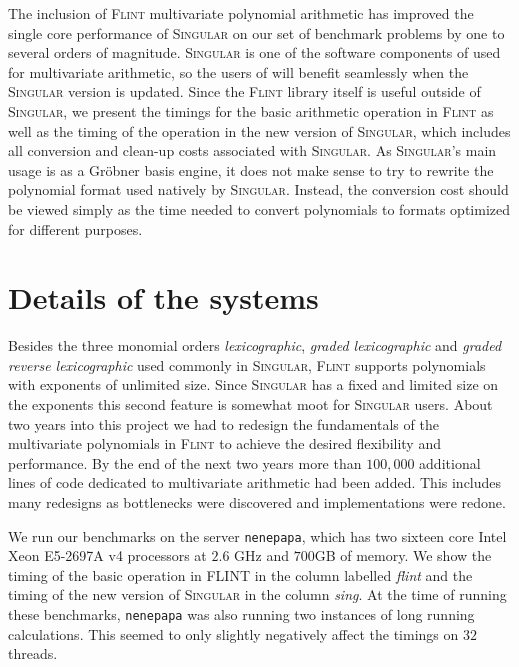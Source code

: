 \documentclass{deliverablereport}
\begin{document}
The inclusion of \textsc{Flint} multivariate polynomial arithmetic has improved the single core performance of \textsc{Singular} on our set of benchmark problems by one to several orders of magnitude. \textsc{Singular} is one of the software components of \Sage used for multivariate arithmetic, so the users of \Sage will benefit seamlessly when the \textsc{Singular} version is updated. Since the \textsc{Flint} library itself is useful outside of \textsc{Singular}, we present the timings for the basic arithmetic operation in \textsc{Flint} as well as the timing of the operation in the new version of \textsc{Singular}, which includes all conversion and clean-up costs associated with \textsc{Singular}. As \textsc{Singular}'s main usage is as a Gr\"obner basis engine, it does not make sense to try to rewrite the polynomial format used natively by \textsc{Singular}. Instead, the conversion cost should be viewed simply as the time needed to convert polynomials to formats optimized for different purposes.

\section{Details of the systems}
Besides the three monomial orders \emph{lexicographic}, \emph{graded lexicographic} and \emph{graded reverse lexicographic} used commonly in \textsc{Singular}, \textsc{Flint} supports polynomials with exponents of unlimited size. Since \textsc{Singular} has a fixed and limited size on the exponents this second feature is somewhat moot for \textsc{Singular} users. About two years into this project we had to redesign the fundamentals of the multivariate polynomials in \textsc{Flint} to achieve the desired flexibility and performance. By the end of the next two years more than $100,000$ additional lines of code dedicated to multivariate arithmetic had been added. This includes many redesigns as bottlenecks were discovered and implementations were redone.

We run our benchmarks on the server {\tt nenepapa}, which has two sixteen core Intel Xeon E5-2697A v4 processors at $2.6$ GHz and $700$GB of memory. We show the timing of the basic operation in \textsc{FLINT} in the column labelled \emph{flint} and the timing of the new version of \textsc{Singular} in the column \emph{sing}. At the time of running these benchmarks, {\tt nenepapa} was also running two instances of long running calculations. This seemed to only slightly negatively affect the timings on $32$ threads.
\end{document}
